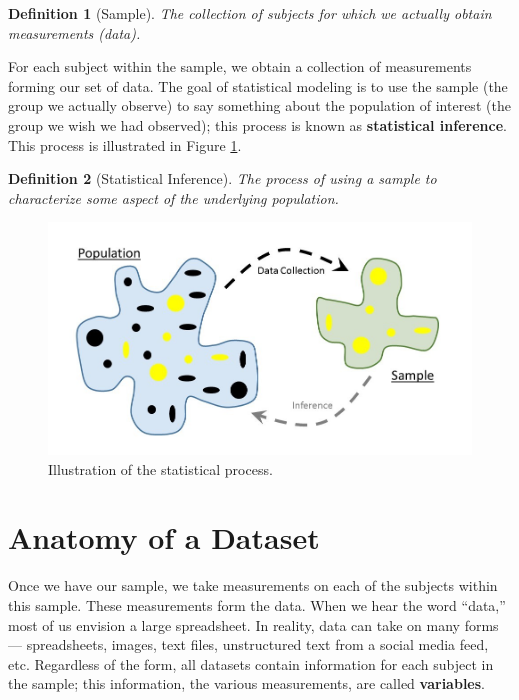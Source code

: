\documentclass[
]{book}
\theoremstyle{plain}
\theoremstyle{mydefn}
\newtheorem{definition}{Definition}[chapter]
\theoremstyle{myexmpl}
\theoremstyle{remark}
\begin{document}
\begin{definition}[Sample]
\protect\hypertarget{def:defn-sample}{}{\label{def:defn-sample} {} }The collection of subjects for which we actually obtain measurements (data).
\end{definition}

For each subject within the sample, we obtain a collection of measurements forming our set of data. The goal of statistical modeling is to use the sample (the group we actually observe) to say something about the population of interest (the group we wish we had observed); this process is known as \textbf{statistical inference}. This process is illustrated in Figure \ref{fig:basics-statistical-process}.

\begin{definition}[Statistical Inference]
\protect\hypertarget{def:defn-inference}{}{\label{def:defn-inference} {} }The process of using a sample to characterize some aspect of the underlying population.
\end{definition}

\begin{figure}

{\centering \includegraphics[width=0.8\linewidth]{images/Basics-Stat-Process} 

}

\caption{Illustration of the statistical process.}\label{fig:basics-statistical-process}
\end{figure}

\hypertarget{anatomy-of-a-dataset}{%
\section{Anatomy of a Dataset}\label{anatomy-of-a-dataset}}

Once we have our sample, we take measurements on each of the subjects within this sample. These measurements form the data. When we hear the word ``data,'' most of us envision a large spreadsheet. In reality, data can take on many forms --- spreadsheets, images, text files, unstructured text from a social media feed, etc. Regardless of the form, all datasets contain information for each subject in the sample; this information, the various measurements, are called \textbf{variables}.
\end{document}
